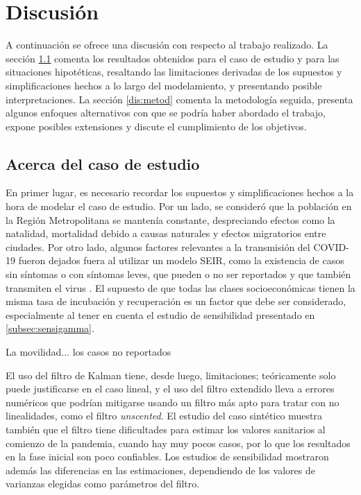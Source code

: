 \chapter{Discusión} \label{chap:discus}

A continuación se ofrece una discusión con respecto al trabajo realizado. La sección \ref{dis:caso} comenta los resultados obtenidos para el caso de estudio y para las situaciones hipotéticas, resaltando las limitaciones derivadas de los supuestos y simplificaciones hechos a lo largo del modelamiento, y presentando posible interpretaciones. La sección \ref{dis:metod} comenta la metodología seguida, presenta algunos enfoques alternativos con que se podría haber abordado el trabajo, expone posibles extensiones y discute el cumplimiento de los objetivos.

\section{Acerca del caso de estudio}\label{dis:caso}

En primer lugar, es necesario recordar los supuestos y simplificaciones hechos a la hora de modelar el caso de estudio. Por un lado, se consideró que la población en la Región Metropolitana se mantenía constante, despreciando efectos como la natalidad, mortalidad debido a causas naturales y efectos migratorios entre ciudades. Por otro lado, algunos factores relevantes a la transmisión del COVID-19 fueron dejados fuera al utilizar un modelo SEIR, como la existencia de casos sin síntomas o con síntomas leves, que pueden o no ser reportados y que también transmiten el virus \cite{Li2020c}\cite{Byambasuren2020}\cite{Gao2021}. El supuesto de que todas las clases socioeconómicas tienen la misma tasa de incubación y recuperación es un factor que debe ser considerado, especialmente al tener en cuenta el estudio de sensibilidad presentado en \ref{subsec:sensigamma}.

La movilidad... los casos no reportados

El uso del filtro de Kalman tiene, desde luego, limitaciones; teóricamente solo puede justificarse en el caso lineal, y el uso del filtro extendido lleva a errores numéricos que podrían mitigarse usando un filtro más apto para tratar con no linealidades, como el filtro \textit{unscented}. El estudio del caso sintético muestra también que el filtro tiene dificultades para estimar los valores sanitarios al comienzo de la pandemia, cuando hay muy pocos casos, por lo que los resultados en la fase inicial son poco confiables. Los estudios de sensibilidad mostraron además las diferencias en las estimaciones, dependiendo de los valores de varianzas elegidas como parámetros del filtro.

